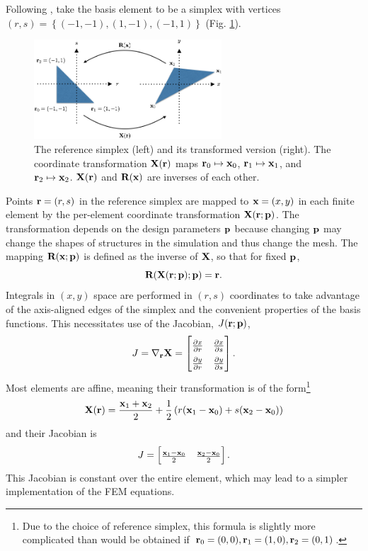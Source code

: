Following \cite{hesthaven2007nodal}, take the basis element to be a simplex with vertices $(r,s) = \left\{ (-1,-1), (1,-1), (-1,1) \right\}$ (Fig. \ref{fig:reference_simplex}).
%
\begin{figure}[!ht]
\centerline{\includegraphics[width=7cm]{reference_simplex.png}}
\caption{The reference simplex (left) and its transformed version (right).  The coordinate transformation $\textbf{X}(\textbf{r})$ maps $\textbf{r}_0 \mapsto \textbf{x}_0$, $\textbf{r}_1 \mapsto \textbf{x}_1$, and $\textbf{r}_2 \mapsto \textbf{x}_2$.  $\textbf{X}(\textbf{r})$ and $\textbf{R}(\textbf{x})$ are inverses of each other.}
\label{fig:reference_simplex}
\end{figure}
%
Points $\textbf{r} = (r,s)$ in the reference simplex are mapped to $\textbf{x} = (x,y)$ in each finite element by the per-element coordinate transformation $\textbf{X}(\textbf{r}; \textbf{p})$.  The transformation depends on the design parameters $\textbf{p}$ because changing $\textbf{p}$ may change the shapes of structures in the simulation and thus change the mesh.  The mapping $\textbf{R}(\textbf{x}; \textbf{p})$ is defined as the inverse of $\textbf{X}$, so that for fixed $\textbf{p}$,
%
\begin{equation}
\textbf{R}(\textbf{X}(\textbf{r}; \textbf{p}); \textbf{p}) = \textbf{r}.
\end{equation}
%
Integrals in $(x,y)$ space are performed in $(r,s)$ coordinates to take advantage of the axis-aligned edges of the simplex and the convenient properties of the basis functions.  This necessitates use of the Jacobian, $J(\textbf{r}; \textbf{p})$,
%
\begin{equation}
\renewcommand\arraystretch{1.5}
J = \nabla_{\ve r} \ve X =
\begin{bmatrix}
\pp{x}{r} & \pp{x}{s} \\
\pp{y}{r} & \pp{y}{s}
\end{bmatrix}.
\end{equation}
%
Most elements are affine, meaning their transformation is of the form\footnote{Due to the choice of reference simplex, this formula is slightly more complicated than would be obtained if $\textbf{r}_0 = (0,0), \textbf{r}_1 = (1,0), \textbf{r}_2 = (0,1)$.}
%
\begin{equation}
\textbf{X}(\textbf{r}) = \frac{\textbf{x}_1 + \textbf{x}_2}{2} + \frac{1}{2}\left(r (\textbf{x}_1 - \textbf{x}_0) + s (\textbf{x}_2 - \textbf{x}_0) \right)
\end{equation}
%
and their Jacobian is
%
\begin{equation}
\renewcommand\arraystretch{1.5}
J =
\begin{bmatrix}
\frac{\ve x_1 - \ve x_0}{2} &  \frac{\ve x_2 - \ve x_0}{2}
\end{bmatrix}.
\end{equation}
This Jacobian is constant over the entire element, which may lead to a simpler implementation of the FEM equations.

